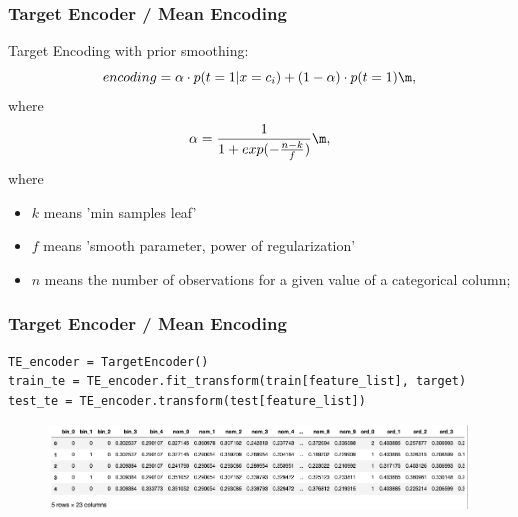 \documentclass{beamer}
\begin{document}
    \begin{frame}[fragile]
        \frametitle{Target Encoder / Mean Encoding}
        Target Encoding with prior smoothing:
        \[
            encoding = \alpha \cdot p(t = 1 | x = c_i) + (1-\alpha) \cdot p(t=1) \m ,
        \] where
        \[
            \alpha = \frac{1}{1 + exp(-\frac{n-k}{f})} \m ,
        \] where
        \begin{itemize}
            \item $k$ means 'min samples leaf'
            \item $f$ means 'smooth parameter, power of regularization'
            \item $n$ means the number of observations for a given value of a categorical column;
        \end{itemize}
    \end{frame}

    \begin{frame}[fragile]
        \frametitle{Target Encoder / Mean Encoding}
        \begin{lstlisting}
TE_encoder = TargetEncoder()
train_te = TE_encoder.fit_transform(train[feature_list], target)
test_te = TE_encoder.transform(test[feature_list])
        \end{lstlisting}

        \begin{figure}
            \begin{center}
                \includegraphics[scale=0.5]{target_sample.png}
            \end{center}
        \end{figure}
    \end{frame}
\end{document}
